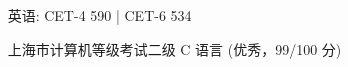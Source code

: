 \documentclass{sorahjy_cv}
\begin{document}
%
%



%
%

\begin{description}{}
	\item{\ \ } 英语: CET-4 590 | CET-6 534
	\item{\ \ } 上海市计算机等级考试二级 C 语言 (优秀，99/100 分)
\end{description}





\end{document}
